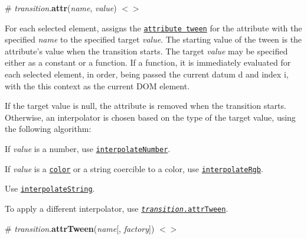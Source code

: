 \label{_transition_attr}%
\# {\itshape transition}.{\bfseries attr}({\itshape name}, {\itshape value}) \href{https://github.com/d3/d3-transition/blob/master/src/transition/attr.js}{\tt $<$$>$}

For each selected element, assigns the \href{#transition_attrTween}{\tt attribute tween} for the attribute with the specified {\itshape name} to the specified target {\itshape value}. The starting value of the tween is the attribute’s value when the transition starts. The target {\itshape value} may be specified either as a constant or a function. If a function, it is immediately evaluated for each selected element, in order, being passed the current datum {\ttfamily d} and index {\ttfamily i}, with the {\ttfamily this} context as the current D\+OM element.

If the target value is null, the attribute is removed when the transition starts. Otherwise, an interpolator is chosen based on the type of the target value, using the following algorithm\+:


\begin{DoxyEnumerate}
\item If {\itshape value} is a number, use \href{https://github.com/d3/d3-interpolate#interpolateNumber}{\tt interpolate\+Number}.
\item If {\itshape value} is a \href{https://github.com/d3/d3-color#color}{\tt color} or a string coercible to a color, use \href{https://github.com/d3/d3-interpolate#interpolateRgb}{\tt interpolate\+Rgb}.
\item Use \href{https://github.com/d3/d3-interpolate#interpolateString}{\tt interpolate\+String}.
\end{DoxyEnumerate}

To apply a different interpolator, use \href{#transition_attrTween}{\tt {\itshape transition}.attr\+Tween}.

\label{_transition_attrTween}%
\# {\itshape transition}.{\bfseries attr\+Tween}({\itshape name}\mbox{[}, {\itshape factory}\mbox{]}) \href{https://github.com/d3/d3-transition/blob/master/src/transition/attrTween.js}{\tt $<$$>$}

